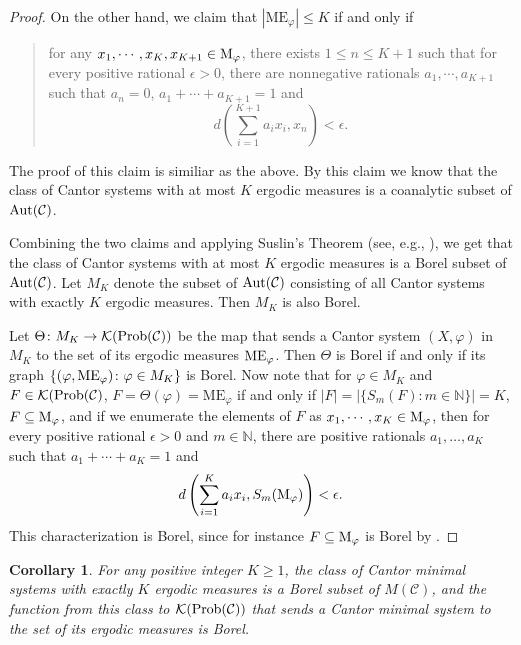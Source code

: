 \documentclass{amsart}
\newtheorem{corollary}[theorem]{Corollary}
\theoremstyle{definition}
\theoremstyle{problem}
\theoremstyle{remark}
\numberwithin{equation}{section}
\newcommand{\Aut}{\mbox{\rm Aut}}
\newcommand{\calK}{\mathcal{K}}
\begin{document}
\begin{proof}
On the other hand, we claim that $|\mbox{ME}_\varphi|\leq K $  if and only if 
\begin{quote} for any $x_1,\cdots, x_K, x_{K+1}\in \rm M_\varphi$, there exists $1\leq n \leq K+1$ such that for every positive rational $\epsilon>0$, there are nonnegative  rationals $a_1,\cdots, a_{K+1}$ such that $a_n=0$,  $a_1+\cdots+a_{K+1}=1$ and $$d\left(\sum_{i=1}^{K+1}a_ix_i,x_n\right)< \epsilon. $$ 
\end{quote}
The proof of this claim  is similiar as the above.  By this claim  we know that the class of Cantor systems with at most $K$ ergodic measures is a coanalytic subset of $\Aut(\mathcal{C})$. 

Combining the two claims and applying Suslin's Theorem (see, e.g., \cite[Theorem 14.11]{KechrisBook}), we get that the class of Cantor systems with at most $K$ ergodic measures is a Borel subset of $\Aut(\mathcal{C})$. Let $M_K$ denote the subset of $\Aut(\mathcal{C})$ consisting of all Cantor systems with exactly $K$ ergodic measures. Then $M_K$ is also Borel.

Let $\Theta\colon M_K\to \calK({\rm Prob}(\mathcal{C}))$ be the map that sends a Cantor system $(X, \varphi)$ in $M_K$ to the set of its ergodic measures $\mbox{\rm ME}_\varphi$. Then $\Theta$ is Borel if and only if its graph $\{(\varphi, \mbox{\rm ME}_\varphi)\colon \varphi\in M_K\}$ is Borel. Now note that for $\varphi\in M_K$ and $F\in \calK(\mbox{\rm Prob}(\mathcal{C})$, $F=\Theta(\varphi)=\mbox{ME}_\varphi$ if and only if $|F|=|\{S_m(F)\colon m\in\mathbb{N}\}|=K$, $F\subseteq \mbox{\rm M}_\varphi$, and if we enumerate the elements of $F$ as $x_1,\cdots, x_K\in \rm{M}_\varphi$, then for every positive rational $\epsilon>0$ and $m\in\mathbb{N}$, there are positive rationals $a_1,\dots, a_K$ such that $a_1+\cdots +a_K=1$ and 
$$d\left(\sum_{i=1}^Ka_ix_i, S_m(\mbox{\rm M}_\varphi)\right)<\epsilon.$$ 
This characterization is Borel, since for instance $F\subseteq \mbox{\rm M}_\varphi$ is Borel by \cite[Exercise 4.29 (ii)]{KechrisBook}. 
\end{proof}

\begin{corollary} \label{cor:KEM}
For any positive integer $K\ge1$, the class of Cantor minimal systems with exactly $K$ ergodic measures is a Borel subset of $M(\mathcal{C})$, and the function from this class to $\calK({\rm Prob}(\mathcal{C}))$ that sends a Cantor minimal system to the set of its ergodic measures is Borel.
\end{corollary}
\end{document}
